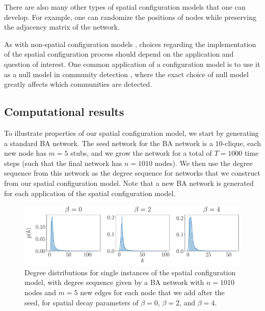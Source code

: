 \documentclass[%
 reprint,
 amsmath,amssymb,
 aps,
]{revtex4-1}
\begin{document}
There are also many other types of spatial configuration models that one can develop. For example, one can randomize the positions of nodes while preserving the adjacency matrix of the network. 

As with non-spatial configuration models \cite{fosdick}, choices regarding the implementation of the spatial configuration process should depend on the application and question of interest. One common application of a configuration model is to use it as a null model in community detection \cite{forcechains, community1, community2}, where the exact choice of null model greatly affects which communities are detected. 



\subsection{Computational results}

To illustrate properties of our spatial configuration model, we start by generating a standard BA network. The seed network for the BA network is a $10$-clique, each new node has $m=5$ stubs, and we grow the network for a total of $T=1000$ time steps (such that the final network has $n=1010$ nodes). We then use the degree sequence from this network as the degree sequence for networks that we construct from our spatial configuration model. {\color{red}Note that a new BA network is generated for each application of the spatial configuration model.}

\begin{figure}
    \centering
    \includegraphics[width=1.0\linewidth]{spatial_configuration_degree_distribution.pdf}
    \caption{Degree distributions for single instances of the spatial configuration 
     model, with degree sequence given by a BA network with $n=1010$ nodes and $m=5$ new edges for each node that we add after the seed, for spatial decay parameters of $\beta = 0$, $\beta = 2$, and $\beta = 4$.
     }
\end{figure}
\end{document}
